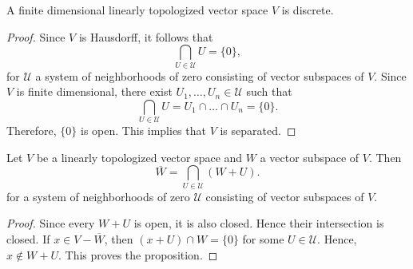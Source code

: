 \begin{proposition}\label{prop:finite_dimensional_linear_topologies}
A finite dimensional linearly topologized vector space $V$ is discrete.
\end{proposition}
\begin{proof}
	Since $V$ is Hausdorff, it follows that
	\[
		\bigcap_{U \in \mathscr{U}}U = \{0\},
	\]
	for $\mathscr{U}$ a system of neighborhoods of zero consisting of vector subspaces of $V$. Since $V$ is finite dimensional, there exist $U_{1}, \ldots, U_{n} \in \mathscr{U}$ such that
	\[
		\bigcap_{U \in \mathscr{U}}U = U_{1}\cap \ldots \cap U_{n} = \{0\}.
	\]
	 Therefore, $\{0\}$ is open. This implies that $V$ is separated.
\end{proof}
\begin{proposition}\label{prop:characterization-of-closure}
	Let $V$ be a linearly topologized vector space and $W$ a vector subspace of $V$. Then
	\[
		\overline{W} = \bigcap_{U\in \mathscr{U}} (W + U).
	\]
	for a system of neighborhoods of zero $\mathscr{U}$ consisting of vector subspaces of $V$.
\end{proposition}
\begin{proof}
	Since every $W + U$ is open, it is also closed. Hence their intersection is closed. If $x\in V - \overline{W}$, then $(x + U)\cap W = \{0\}$ for some $U \in \mathscr{U}$. Hence, $x\notin W + U$. This proves the proposition.
\end{proof}
